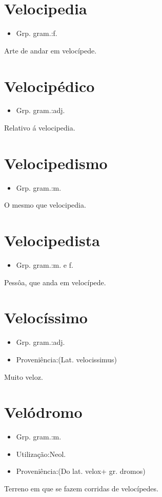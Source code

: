 \documentclass{article}
\begin{document}
\section{Velocipedia}
\begin{itemize}
\item {Grp. gram.:f.}
\end{itemize}
Arte de andar em velocípede.
\section{Velocipédico}
\begin{itemize}
\item {Grp. gram.:adj.}
\end{itemize}
Relativo á velocipedia.
\section{Velocipedismo}
\begin{itemize}
\item {Grp. gram.:m.}
\end{itemize}
O mesmo que \textunderscore velocipedia\textunderscore .
\section{Velocipedista}
\begin{itemize}
\item {Grp. gram.:m.  e  f.}
\end{itemize}
Pessôa, que anda em velocípede.
\section{Velocíssimo}
\begin{itemize}
\item {Grp. gram.:adj.}
\end{itemize}
\begin{itemize}
\item {Proveniência:(Lat. \textunderscore velocissimus\textunderscore )}
\end{itemize}
Muito veloz.
\section{Velódromo}
\begin{itemize}
\item {Grp. gram.:m.}
\end{itemize}
\begin{itemize}
\item {Utilização:Neol.}
\end{itemize}
\begin{itemize}
\item {Proveniência:(Do lat. \textunderscore velox\textunderscore  + gr. \textunderscore dromos\textunderscore )}
\end{itemize}
Terreno em que se fazem corridas de velocípedes.
\end{document}
